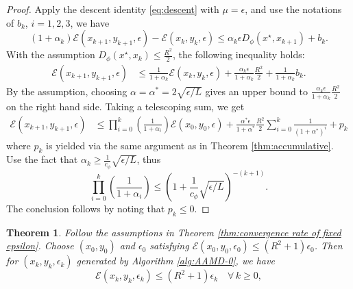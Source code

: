 \documentclass{article}
\theoremstyle{plain}
\newtheorem{theorem}{Theorem}[section]
\theoremstyle{definition}
\theoremstyle{remark}
\begin{document}
	\begin{proof}
	Apply the descent identity \eqref{eq:descent} with $\mu=\epsilon$, and use the notations of $b_k$, $i=1,2,3$, we have
    $$
    (1+\alpha_k)\mathcal E(x_{k+1}, y_{k+1},\epsilon) - \mathcal E(x_k, y_k,\epsilon) \leq \alpha_k\epsilon D_\phi(x^\star,x_{k+1}) + b_k.
    $$ With the assumption $D_\phi(x^{\star}, x_k) \leq \frac{R^2}{2}$, the following inequality holds:
		\begin{equation}
			\begin{aligned}
				\mathcal E(x_{k+1}, y_{k+1},\epsilon) &\leqslant \frac{1}{1+\alpha_k}\mathcal E(x_{k}, y_{k},\epsilon)
				+ \frac{\alpha_k \epsilon}{1+\alpha_k}\frac{R^2}{2} + \frac{1}{1+\alpha_k}b_k.
			\end{aligned}
		\end{equation}
    By the assumption, choosing $\alpha = \alpha^* = 2\sqrt{\epsilon/L}$ gives an upper bound to $\frac{\alpha_k \epsilon}{1+\alpha_k}\frac{R^2}{2}$ on the right hand side. Taking a telescoping sum, we get
        \begin{equation}
            \begin{aligned}
                \mathcal E(x_{k+1}, y_{k+1},\epsilon) &\leqslant \prod_{i=0}^{k}\left(\frac{1}{1+\alpha_i}\right)\mathcal E(x_{0}, y_{0},\epsilon) + 
                \frac{\alpha^* \epsilon }{1+\alpha^*}\frac{R^2}{2}\sum_{i=0}^{k} \frac{1}{(1+\alpha^*)^i} + p_k
            \end{aligned}
        \end{equation}
        where $p_k$ is yielded via the same argument as in Theorem \ref{thm:accumulative}. Use the fact that $\alpha_k \geq \frac{1}{c_{\phi}} \sqrt{\epsilon/L}$, thus%
        \[
        \prod_{i=0}^{k}\left(\frac{1}{1+\alpha_i}\right) \leq \left(1 + \frac{1}{c_{\phi}} \sqrt{\epsilon/L}\right)^{-(k+1)}.
        \]
        The conclusion follows by noting that $p_k \leq 0$.
		\end{proof}

\begin{theorem}
    Follow the assumptions in Theorem \ref{thm:convergence rate of fixed epsilon}. Choose $(x_0, y_0)$ and $\epsilon_0$ satisfying $\mathcal E(x_0, y_0, \epsilon_0) \leq (R^2+ 1)\epsilon_{0}$.
    Then for $(x_{k}, y_{k}, \epsilon_{k})$ generated by Algorithm \ref{alg:AAMD-0}, we have
    \begin{equation}\label{eq:Ek-ek}
        \mathcal E(x_{k}, y_{k}, \epsilon_{k})\leq (R^2+1)\epsilon_{k}\quad\forall\,k\geq0,
    \end{equation}
\end{theorem}
\end{document}
